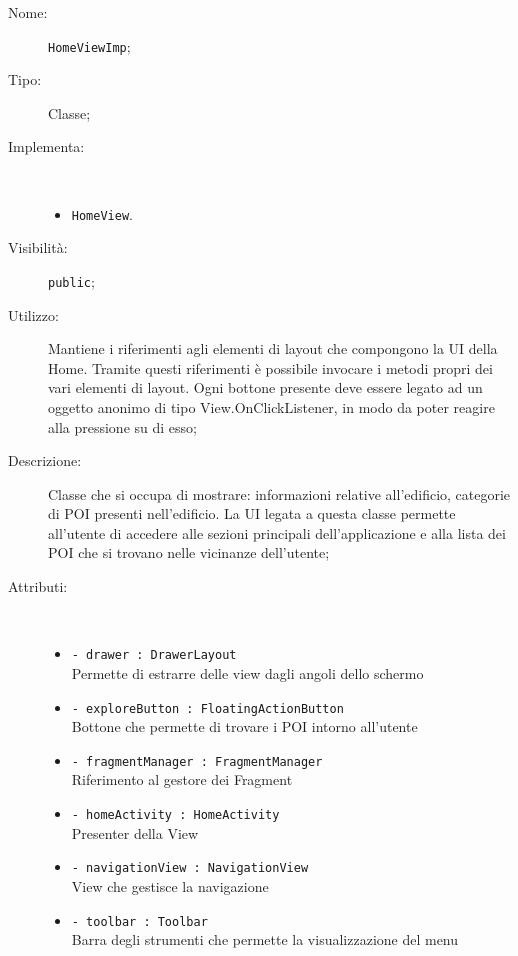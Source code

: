 \documentclass[../DefinizioneDiProdotto.tex]{subfiles}
\begin{document}
\begin{description}
	\item[Nome:] \texttt{HomeViewImp};
	\item[Tipo:] Classe;
	\item[Implementa:] \
	\begin{itemize}
		\item \texttt{HomeView}.
		
	\end{itemize}
	\item[Visibilità:] \texttt{public};
	\item[Utilizzo:] Mantiene i riferimenti agli elementi di layout che compongono la UI della Home. Tramite questi riferimenti è possibile invocare i metodi propri dei vari elementi di layout. 
	Ogni bottone presente deve essere legato ad un oggetto anonimo di tipo View.OnClickListener, in modo da poter reagire alla pressione su di esso;
	\item[Descrizione:] Classe che si occupa di mostrare: informazioni relative all'edificio, categorie di POI presenti nell'edificio. La UI legata a questa classe permette all'utente di accedere alle sezioni principali dell'applicazione e alla lista dei POI che si trovano nelle vicinanze dell'utente;
	\item[Attributi:] \
	\begin{itemize}
		\item \texttt{- drawer : DrawerLayout}\\
		Permette di estrarre delle view dagli angoli dello schermo
		
		\item \texttt{- exploreButton : FloatingActionButton}\\
		Bottone che permette di trovare i POI intorno all'utente
		
		\item \texttt{- fragmentManager : FragmentManager}\\
		Riferimento al gestore dei Fragment
		
		\item \texttt{- homeActivity : HomeActivity}\\
		Presenter della View
		
		\item \texttt{- navigationView : NavigationView}\\
		View che gestisce la navigazione
		
		\item \texttt{- toolbar : Toolbar}\\
		Barra degli strumenti che permette la visualizzazione del menu
		

\end{itemize}
\end{description}
\end{document}
